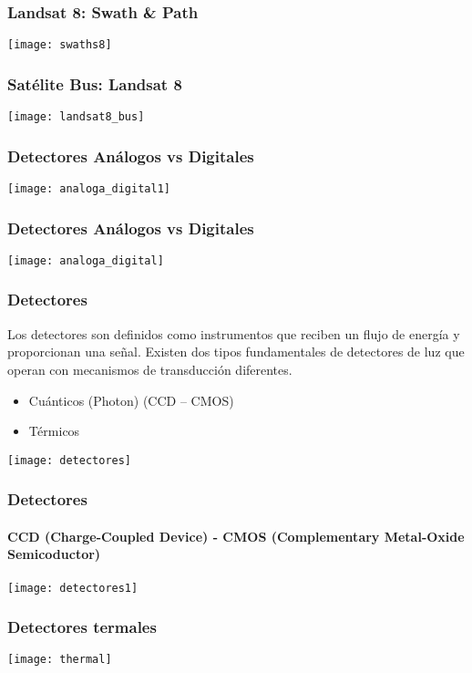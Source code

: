 \documentclass[]{beamer}
\begin{document}
\begin{frame}
\frametitle{Landsat 8: Swath \& Path}
\begin{center}
\texttt{[image: swaths8]}
\end{center}
\end{frame}
\begin{frame}
\frametitle{Satélite Bus: Landsat 8}
\begin{center}
\texttt{[image: landsat8\_bus]}
\end{center}
\end{frame}
\begin{frame}
\frametitle{Detectores Análogos vs Digitales}
\begin{center}
\texttt{[image: analoga\_digital1]}
\end{center}
\end{frame}
\begin{frame}
\frametitle{Detectores Análogos vs Digitales}
\begin{center}
\texttt{[image: analoga\_digital]}
\end{center}
\end{frame}
\begin{frame}
\frametitle{Detectores}
\small{Los detectores son definidos como instrumentos que reciben un flujo de energía y proporcionan una señal. Existen dos tipos fundamentales de detectores de luz que operan con mecanismos de transducción diferentes.
\begin{itemize}
\item Cuánticos (Photon) (CCD – CMOS) 
\item Térmicos 
\end{itemize}
}
\begin{center}
\texttt{[image: detectores]}
\end{center}
\end{frame}
\begin{frame}
\frametitle{Detectores}
\framesubtitle{CCD (Charge-Coupled Device) - CMOS (Complementary Metal-Oxide Semicoductor)}
\begin{center}
\texttt{[image: detectores1]}
\end{center}
\end{frame}
\begin{frame}
\frametitle{Detectores termales}
\begin{center}
\texttt{[image: thermal]}
\end{center}
\end{frame}
\end{document}
